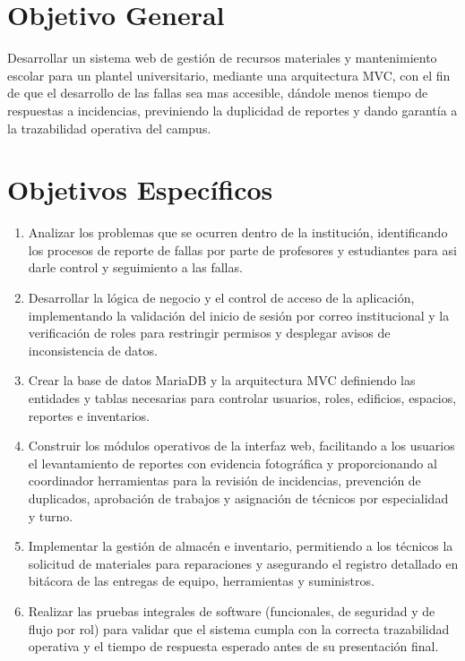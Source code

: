 \section{Objetivo General}

Desarrollar un sistema web de gestión de recursos materiales y mantenimiento escolar para un plantel universitario, mediante una arquitectura MVC, con el fin de que el desarrollo de las fallas sea mas accesible, dándole menos tiempo de respuestas a incidencias, previniendo la duplicidad de reportes y dando garantía a la trazabilidad operativa del campus.

\section{Objetivos Específicos}
\begin{enumerate}
    \item Analizar los problemas que se ocurren dentro de la institución, identificando los procesos de reporte de fallas por parte de profesores y estudiantes para asi darle control y seguimiento a las fallas.
    \item Desarrollar la lógica de negocio y el control de acceso de la aplicación, implementando la validación del inicio de sesión por correo institucional y la verificación de roles para restringir permisos y desplegar avisos de inconsistencia de datos.
    \item Crear la base de datos MariaDB y la arquitectura MVC definiendo las entidades y tablas necesarias para controlar usuarios, roles, edificios, espacios, reportes e inventarios.
    \item Construir los módulos operativos de la interfaz web, facilitando a los usuarios el levantamiento de reportes con evidencia fotográfica y proporcionando al coordinador herramientas para la revisión de incidencias, prevención de duplicados, aprobación de trabajos y asignación de técnicos por especialidad y turno.
    \item Implementar la gestión de almacén e inventario, permitiendo a los técnicos la solicitud de materiales para reparaciones y asegurando el registro detallado en bitácora de las entregas de equipo, herramientas y suministros.
    \item Realizar las pruebas integrales de software (funcionales, de seguridad y de flujo por rol) para validar que el sistema cumpla con la correcta trazabilidad operativa y el tiempo de respuesta esperado antes de su presentación final.
\end{enumerate}

